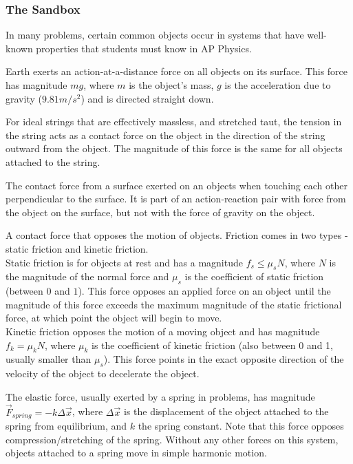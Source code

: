 \subsubsection{The Sandbox}
In many problems, certain common objects occur in systems that have well-known properties that students must know in AP Physics. 
\begin{mdframed}[frametitle=The Gravitational Force]
	Earth exerts an action-at-a-distance force on all objects on its surface. This force has magnitude $mg$, where $m$ is the object's mass, $g$ is the acceleration due to gravity ($9.81 m/s^2$) and is directed straight down.
\end{mdframed}
\begin{mdframed}[frametitle=The String and The Tensile Force]
	For ideal strings that are effectively massless, and stretched taut, the tension in the string acts as a contact force on the object in the direction of the string outward from the object. The magnitude of this force is the same for all objects attached to the string. 
\end{mdframed}
\begin{mdframed}[frametitle=The Normal Force]
	The contact force from a surface exerted on an objects when touching each other perpendicular to the surface. It is part of an action-reaction pair with force from the object on the surface, but not with the force of gravity on the object. 
\end{mdframed}
\begin{mdframed}[frametitle=The Frictional Force]
	A contact force that opposes the motion of objects. Friction comes in two types - static friction and kinetic friction. \\
	Static friction is for objects at rest and has a magnitude $f_s \leq \mu_sN$, where $N$ is the magnitude of the normal force and $\mu_s$ is the coefficient of static friction (between $0$ and $1$). This force opposes an applied force on an object until the magnitude of this force exceeds the maximum magnitude of the static frictional force, at which point the object will begin to move.\\
	Kinetic friction opposes the motion of a moving object and has magnitude $f_k = \mu_kN$, where $\mu_k$ is the coefficient of kinetic friction (also between 0 and 1, usually smaller than $\mu_s$). This force points in the exact opposite direction of the velocity of the object to decelerate the object. 
\end{mdframed}
\begin{mdframed}[frametitle=The Elastic Force]
	The elastic force, usually exerted by a spring in problems, has magnitude $\vec F_{spring} = -k \Delta \vec x$, where $\Delta \vec x$ is the displacement of the object attached to the spring from equilibrium, and $k$ the spring constant. Note that this force opposes compression/stretching of the spring. Without any other forces on this system, objects attached to a spring move in simple harmonic motion. 
\end{mdframed}
